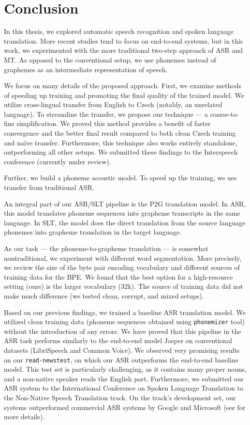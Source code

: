 \chapter*{Conclusion}
\label{chap:conclusion}

In this thesis, we explored automatic speech recognition and spoken language translation. More recent studies tend to focus on end-to-end systems, but in this work, we experimented with the more traditional two-step approach of ASR and MT. As opposed to the conventional setup, we use phonemes instead of graphemes as an intermediate representation of speech.

We focus on many details of the proposed approach. First, we examine methods of speeding up training and promoting the final quality of the trained model. We utilize cross-lingual transfer from English to Czech (notably, an unrelated language). To streamline the transfer, we propose our technique --- a coarse-to-fine simplification. We proved this method provides a benefit of faster convergence and the better final result compared to both clean Czech training and na\"ive transfer. Furthermore, this technique also works entirely standalone, outperforming all other setups. We submitted these findings to the Interspeech conference (currently under review).

Further, we build a phoneme acoustic model. To speed up the training, we use transfer from traditional ASR.

An integral part of our ASR/SLT pipeline is the P2G translation model. In ASR, this model translates phoneme sequences into grapheme transcripts in the same language. In SLT, the model does the direct translation from the source language phonemes into grapheme translation in the target language. 

As our task --- the phoneme-to-grapheme translation --- is somewhat nontraditional, we experiment with different word segmentation. More precisely, we review the size of the byte pair encoding vocabulary and different sources of training data for the BPE. We found that the best option for a high-resource setting (ours) is the larger vocabulary (32k). The source of training data did not make much difference (we tested clean, corrupt, and mixed setups).

Based on our previous findings, we trained a baseline ASR translation model. We utilized clean training data (phoneme sequences obtained using \texttt{phonemizer} tool) without the introduction of any errors. We have proved that this pipeline in the ASR task performs similarly to the end-to-end model Jasper on conventional datasets (LibriSpeech and Common Voice). We observed very promising results on our \texttt{read-newstest}, on which our ASR outperforms the end-to-end baseline model. This test set is particularly challenging, as it contains many proper nouns, and a non-native speaker reads the English part. Furthermore, we submitted our ASR system to the International Conference on Spoken Language Translation to the Non-Native Speech Translation track. On the track's development set, our systems outperformed commercial ASR systems by Google and Microsoft (see  for more details).

